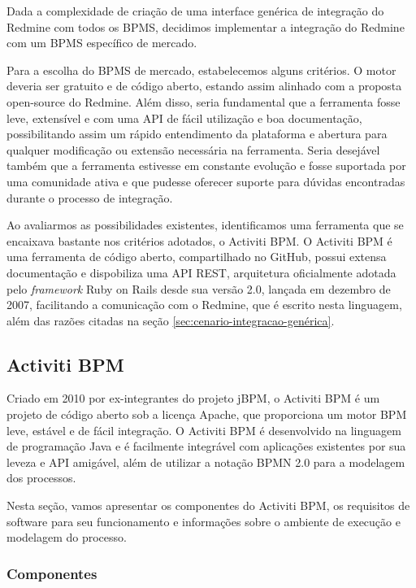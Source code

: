 Dada a complexidade de criação de uma interface genérica de integração do Redmine com todos os BPMS, decidimos implementar a integração do Redmine com um BPMS específico de mercado. 

Para a escolha do BPMS de mercado, estabelecemos alguns critérios. O motor deveria ser gratuito e de código aberto, estando assim alinhado com a proposta open-source do Redmine. Além disso, seria fundamental que a ferramenta fosse leve, extensível e com uma API de fácil utilização e boa documentação, possibilitando assim um rápido entendimento da plataforma e abertura para qualquer modificação ou extensão necessária na ferramenta. Seria desejável também que a ferramenta estivesse em constante evolução e fosse suportada por uma comunidade ativa e que pudesse oferecer suporte para dúvidas encontradas durante o processo de integração.

Ao avaliarmos as possibilidades existentes, identificamos uma ferramenta que se encaixava bastante nos critérios adotados, o Activiti BPM. O Activiti BPM é uma ferramenta de código aberto, compartilhado no GitHub\cite{activiti_github}, possui extensa documentação\cite{activiti-userguide} e dispobiliza uma API REST, arquitetura oficialmente adotada pelo \textit{framework} Ruby on Rails desde sua versão 2.0, lançada em dezembro de 2007\cite{rails_rest_support}, facilitando a comunicação com o Redmine, que é escrito nesta linguagem, além das razões citadas na seção \ref{sec:cenario-integracao-genérica}.

\subsection{Activiti BPM}\label{sec:activiti}
Criado em 2010 por ex-integrantes do projeto jBPM\cite{bpm_jbpm}, o Activiti BPM\cite{bpm_activiti} é um projeto de código aberto sob a licença Apache\cite{apache_license}, que proporciona um motor BPM leve, estável e de fácil integração. O Activiti BPM é desenvolvido na linguagem de programação Java\cite{java-history} e é facilmente integrável com aplicações existentes por sua leveza e API\cite{api} amigável, além de utilizar a notação BPMN 2.0 para a modelagem dos processos.

Nesta seção, vamos apresentar os componentes do Activiti BPM, os requisitos de software para seu funcionamento e informações sobre o ambiente de execução e modelagem do processo.

\subsubsection{Componentes}\label{sec:automatizacao_processos-gestao_processos}

